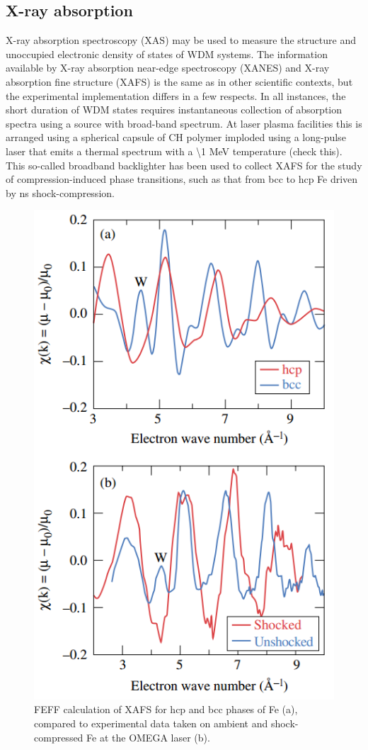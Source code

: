\documentclass [11pt, proquest, article] {uwthesis}[2016/11/22]
\begin{document}
\subsection{X-ray absorption}
X-ray absorption spectroscopy (XAS) may be used to measure the structure and unoccupied electronic density of states of WDM systems. The information available by X-ray absorption near-edge spectroscopy (XANES) and X-ray absorption fine structure (XAFS) is the same as in other scientific contexts, but the experimental implementation differs in a few respects. In all instances, the short duration of WDM states requires instantaneous collection of absorption spectra using a source with broad-band spectrum. At laser plasma facilities this is arranged using a spherical capsule of CH polymer imploded using a long-pulse laser that emits a thermal spectrum with a \textbackslash 1 MeV temperature (check this).\cite{yaakobi2003extended} This so-called broadband backlighter has been used to collect XAFS for the study of compression-induced phase transitions, such as that from bcc to hcp Fe driven by ns shock-compression.\cite{yaakobi2005exafs}

\begin{figure}[h] 
\caption{FEFF calculation of XAFS for hcp and bcc phases of Fe (a), compared to experimental data taken on ambient and shock-compressed Fe at the OMEGA laser (b). \cite{yaakobi2005exafs}}
\label{fig:xafs}
\centering
\includegraphics[scale=0.6]{../Figures/yaakobi_shock_xafs.png}
\end{figure}
\end{document}
